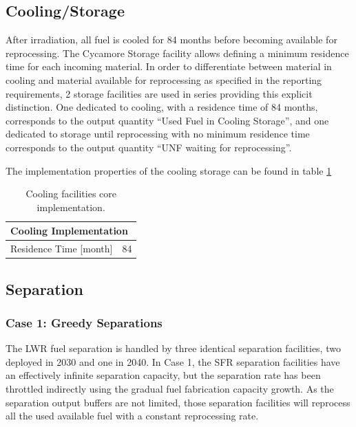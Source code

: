 \documentclass[12pt]{article}
\begin{document}
\subsection{Cooling/Storage}

After irradiation, all fuel is cooled for 84 months before becoming available
for reprocessing.  The Cycamore Storage facility allows defining a minimum
residence time for each incoming material.  In order to 
differentiate between material in cooling and material available for
reprocessing as specified in the reporting requirements, 
2 storage facilities are used in series providing this explicit
distinction. One dedicated to cooling, with a residence time of 84 months,
corresponds to the output quantity ``Used Fuel in Cooling Storage'', and
one dedicated to storage until reprocessing with no minimum residence time
corresponds to the output quantity ``UNF waiting for reprocessing''.

The implementation properties of the cooling storage can be found in table \ref{tab:cooling_1} 
\begin{table}[h!]
    \centering
    \begin{tabular}{ll}
    \hline
    \multicolumn{2}{l}{Cooling Implementation}  \\
    \hline
    Residence Time [month]   &  84  \\
    \hline
    \end{tabular}
    \caption{Cooling facilities core implementation.}
    \label{tab:cooling_1}
\end{table}

\subsection{Separation}

\subsubsection{Case 1: Greedy Separations}

The LWR fuel separation is handled by three identical separation facilities, two
deployed in 2030 and one in 2040. In Case 1, the SFR separation facilities have
an effectively infinite separation capacity, but the separation rate has been
throttled indirectly using the gradual fuel fabrication capacity growth. 
As the separation output buffers are not limited, those separation facilities will
reprocess all the used available fuel with a constant reprocessing rate.
\end{document}
